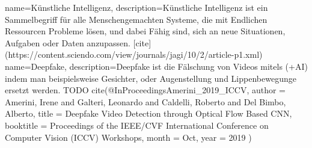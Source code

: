 {
    name={Künstliche Intelligenz},
    description={Künstliche Intelligenz ist ein Sammelbegriff für alle Menschengemachten Systeme, die mit Endlichen Ressourcen Probleme lösen, und dabei Fähig sind, sich an neue Situationen, Aufgaben oder Daten anzupassen. [cite](https://content.sciendo.com/view/journals/jagi/10/2/article-p1.xml)}
}
{
  name={Deepfake},
  description={Deepfake ist die Fälschung von Videos mitels (+AI) indem man beispielsweise Gesichter, oder Augenstellung und Lippenbewegunge ersetzt werden.
    TODO cite(@InProceedings{Amerini_2019_ICCV,
author = {Amerini, Irene and Galteri, Leonardo and Caldelli, Roberto and Del Bimbo, Alberto},
title = {Deepfake Video Detection through Optical Flow Based CNN},
booktitle = {Proceedings of the IEEE/CVF International Conference on Computer Vision (ICCV) Workshops},
month = {Oct},
year = {2019}
} )}
}
